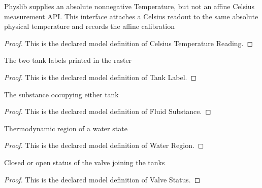 \begin{definition}
  \label{def:physics:phyx-mini-0439:phyxminiproblems-problemphyxmini0439-celsiustemperaturereading}
  Physlib supplies an absolute nonnegative Temperature, but not an affine Celsius measurement API. This interface attaches a Celsius readout to the same absolute physical temperature and records the affine calibration
\end{definition}
\begin{proof}
  This is the declared model definition of Celsius Temperature Reading.
\end{proof}
\begin{definition}
  \label{def:physics:phyx-mini-0439:phyxminiproblems-problemphyxmini0439-tanklabel}
  The two tank labels printed in the raster
\end{definition}
\begin{proof}
  This is the declared model definition of Tank Label.
\end{proof}
\begin{definition}
  \label{def:physics:phyx-mini-0439:phyxminiproblems-problemphyxmini0439-fluidsubstance}
  The substance occupying either tank
\end{definition}
\begin{proof}
  This is the declared model definition of Fluid Substance.
\end{proof}
\begin{definition}
  \label{def:physics:phyx-mini-0439:phyxminiproblems-problemphyxmini0439-waterregion}
  Thermodynamic region of a water state
\end{definition}
\begin{proof}
  This is the declared model definition of Water Region.
\end{proof}
\begin{definition}
  \label{def:physics:phyx-mini-0439:phyxminiproblems-problemphyxmini0439-valvestatus}
  Closed or open status of the valve joining the tanks
\end{definition}
\begin{proof}
  This is the declared model definition of Valve Status.
\end{proof}
